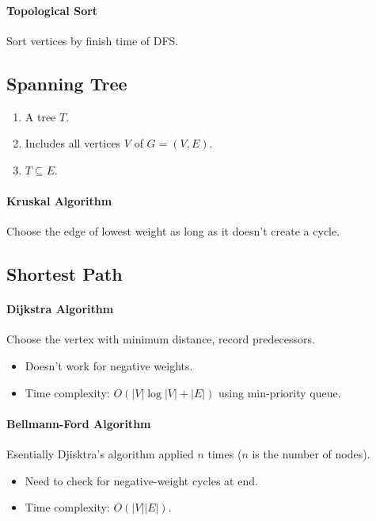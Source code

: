 \documentclass[twocolumn,english]{article}
\numberwithin{equation}{section}
\numberwithin{figure}{section}
\numberwithin{table}{section}
\begin{document}
\paragraph{Topological Sort}

Sort vertices by finish time of DFS.


\subsection{Spanning Tree}
\begin{enumerate}
\item A tree $T$. 
\item Includes all vertices $V$ of $G=\left(V,E\right)$. 
\item $T\subseteq E$. 
\end{enumerate}

\paragraph{Kruskal Algorithm}

Choose the edge of lowest weight as long as it doesn't create a cycle.


\subsection{Shortest Path}


\paragraph{Dijkstra Algorithm}

Choose the vertex with minimum distance, record predecessors. 
\begin{itemize}
\item Doesn't work for negative weights. 
\item Time complexity: $O\left(\left|V\right|\log\left|V\right|+\left|E\right|\right)$
using min-priority queue. 
\end{itemize}

\paragraph{Bellmann-Ford Algorithm}

Esentially Djisktra's algorithm applied $n$ times ($n$ is the number
of nodes). 
\begin{itemize}
\item Need to check for negative-weight cycles at end. 
\item Time complexity: $O\left(\left|V\right|\left|E\right|\right)$. 
\end{itemize}
\end{document}
